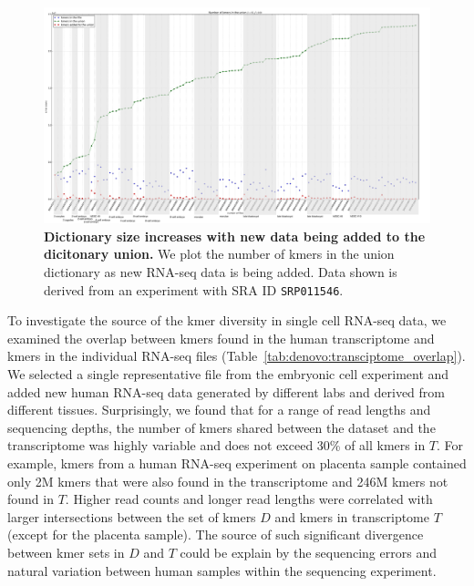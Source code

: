 \documentclass[12pt]{cmuthesis}
\begin{document}
    \begin{figure}
    	\centering
      \includegraphics[width=\linewidth]{figures/huffmer-rnaseq-experiment-cells}
      \caption{\textbf{Dictionary size increases with new data being added to the dicitonary union.} We plot the number of kmers in the union dictionary as new RNA-seq data is being added. Data shown is derived from an experiment with SRA ID \texttt{SRP011546}.}
      \label{fig:denovo:rnaseq}
    \end{figure}

    To investigate the source of the kmer diversity in single cell RNA-seq data, we examined the overlap between kmers found in the human transcriptome and kmers in the individual RNA-seq files (Table~\ref{tab:denovo:transciptome_overlap}). We selected a single representative file from the embryonic cell experiment and added new human RNA-seq data generated by different labs and derived from different tissues. Surprisingly, we found that for a range of read lengths and sequencing depths, the number of kmers shared between the dataset and the transcriptome was highly variable and does not exceed 30\% of all kmers in $T$. For example, kmers from a human RNA-seq experiment on placenta sample contained only 2M kmers that were also found in the transcriptome and 246M kmers not found in $T$. Higher read counts and longer read lengths were correlated with larger intersections between the set of kmers $D$ and kmers in transcriptome $T$ (except for the placenta sample). The source of such significant divergence between kmer sets in $D$ and $T$ could be explain by the sequencing errors and natural variation between human samples within the sequencing experiment.
    
\end{document}
